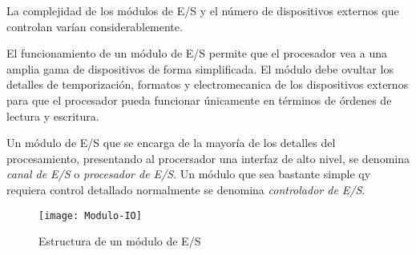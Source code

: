 La complejidad de los módulos de E/S y el número de dispositivos externos que controlan varían considerablemente. 

El funcionamiento de un módulo de E/S permite que el procesador vea a una amplia gama de dispositivos de forma simplificada. El módulo debe ovultar los detalles de temporización, formatos y electromecanica de los dispositivos externos para que el procesador pueda funcionar únicamente en términos de órdenes de lectura y escritura.

Un módulo de E/S que se encarga de la mayoría de los detalles del procesamiento, presentando al procersador una interfaz de alto nivel, se denomina \textit{canal de E/S} o \textit{procesador de E/S}. Un módulo que sea bastante simple qy requiera control detallado normalmente se denomina \textit{controlador de E/S}.

\begin{figure}[h]
  \centering
  \texttt{[image: Modulo-IO]}
  \caption{Estructura de un módulo de E/S}\label{fig:Estructura-modulo-E/S}
\end{figure}